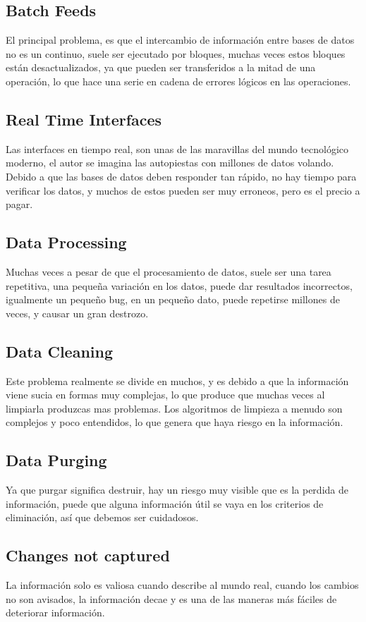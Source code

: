 \documentclass{article}
\begin{document}
\subsection{Batch Feeds}
El principal problema, es que el intercambio de información entre bases de datos no es un continuo, suele ser ejecutado por bloques, muchas veces estos bloques están desactualizados, ya que pueden ser transferidos a la mitad de una operación, lo que hace una serie en cadena de errores lógicos en las operaciones.
\subsection{Real Time Interfaces}
Las interfaces en tiempo real, son unas de las maravillas del mundo tecnológico moderno, el autor se imagina las autopiestas con millones de datos volando.\medbreak
Debido a que las bases de datos deben responder tan rápido, no hay tiempo para verificar los datos, y muchos de estos pueden ser muy erroneos, pero es el precio a pagar. 
\subsection{Data Processing}
Muchas veces a pesar de que el procesamiento de datos, suele ser una tarea repetitiva, una pequeña variación en los datos, puede dar resultados incorrectos, igualmente un pequeño bug, en un pequeño dato, puede repetirse millones de veces, y causar un gran destrozo.
\subsection{Data Cleaning}
Este problema realmente se divide en muchos, y es debido a que la información viene sucia en formas muy complejas, lo que produce que muchas veces al limpiarla produzcas mas problemas.\medbreak
Los algoritmos de limpieza a menudo son complejos y poco entendidos, lo que genera que haya riesgo en la información.
\subsection{Data Purging}
Ya que purgar significa destruir, hay un riesgo muy visible que es la perdida de información, puede que alguna información útil se vaya en los criterios de eliminación, así que debemos ser cuidadosos.
\subsection{Changes not captured}
La información solo es valiosa cuando describe al mundo real, cuando los cambios no son avisados, la información decae y es una de las maneras más fáciles de deteriorar información.
\end{document}
